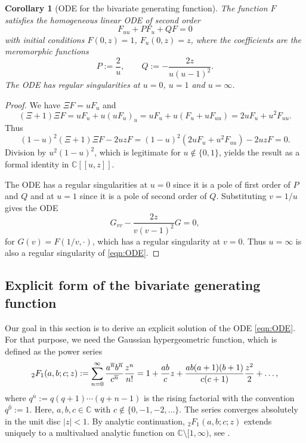 \documentclass[11pt,a4paper]{article}
\numberwithin{equation}{section}
\newtheorem {corollary}[theorem]{Corollary}
\def\CC{\mathbb{C}}
\begin{document}
\begin{corollary}[ODE for the bivariate generating function]
The function $F$ satisfies the homogeneous linear ODE of second order
\begin{equation}\label{eqn:ODE}
    F_{uu} + P F_u  + Q F = 0
\end{equation}
with initial conditions $F(0,z)=1$, $F_u(0,z)=z$, where the coefficients are the meromorphic functions
\begin{equation*}
    P := \frac{2}{u}, \qquad Q:= -\frac{2z}{u(u-1)^2}.
\end{equation*}
The ODE has regular singularities at $u=0$, $u=1$ and $u=\infty$.
\end{corollary}
\begin{proof}
We have $\Xi F=uF_u$ and
$$
(\Xi+1)\Xi F=uF_u+u(uF_u)_u = uF_u+u(F_u+uF_{uu}) = 2uF_u+u^2F_{uu}.
$$
Thus
$$
(1-u)^2(\Xi+1)\Xi F-2uzF = (1-u)^2(2uF_u+u^2F_{uu})-2uzF = 0.
$$
Division by $u^2(1-u)^2$, which is legitimate for $u\notin\{0,1\}$, yields the result as a formal identity in $\CC[[u,z]]$.

The ODE has a regular singularities at $u=0$ since it is a pole of first order of $P$ and $Q$ and at $u=1$ since it is a pole of second order of $Q$. Substituting $v=1/u$ gives the ODE
\begin{equation*}
    G_{vv} - \frac{2z}{v(v-1)^2} G = 0,
\end{equation*}
for $G(v) = F(1/v,\cdot)$, which has a regular singularity at $v=0$. Thus $u=\infty$ is also a regular singularity of \eqref{eqn:ODE}.
\end{proof}



\subsection{Explicit form of the bivariate generating function}

Our goal in this section is to derive an explicit solution of the ODE \eqref{eqn:ODE}. For that purpose, we need the Gaussian hypergeometric function, which is defined as the power series
\begin{equation}\label{def:hypergeo}
    {_2F_1}(a,b;c;z) := \sum_{n=0}^\infty{a^{\overline{n}} b^{\overline{n}} \over c^{\overline{n}}}{z^n\over n!} = 1 +{ab\over c}z+{ab(a+1)(b+1)\over c(c+1)}{z^2\over 2}+ \ldots,
\end{equation}
where $q^{\overline{n}}:=q(q+1)\cdots(q+n-1)$ is the rising factorial with the convention $q^{\overline{0}}:=1$. 
Here, $a,b,c\in\CC$ with $c\notin\{0,-1,-2,\ldots\}$. The series converges absolutely in the unit disc $|z|<1$. By analytic continuation, ${_2F_1}(a,b;c;z)$ extends uniquely to a multivalued analytic function on $\CC\setminus[1,\infty)$, see \cite[Section 5.2]{Temme}.
\end{document}
